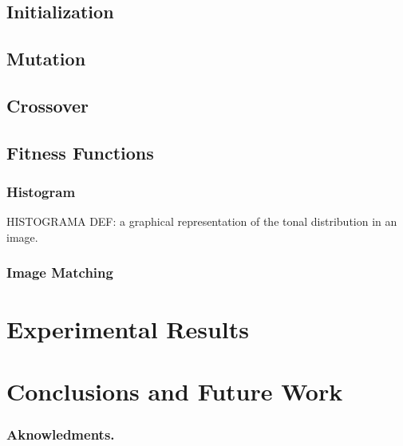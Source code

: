 \documentclass[conference]{IEEEtran}
\begin{document}
\subsection{Initialization}\label{go:init}
\subsection{Mutation}\label{go:mutation}
\subsection{Crossover}\label{go:crossover}
\subsection{Fitness Functions}\label{go:fitness}
\subsubsection{Histogram}\label{go:fitness:hist}
HISTOGRAMA DEF: a graphical representation of the tonal distribution in an image.
\subsubsection{Image Matching}\label{go:fitness:image_match}

\section{Experimental Results} \label{exper}

\section{Conclusions and Future Work}\label{conclusions}

\subsubsection*{Aknowledments.} 



\end{document}
